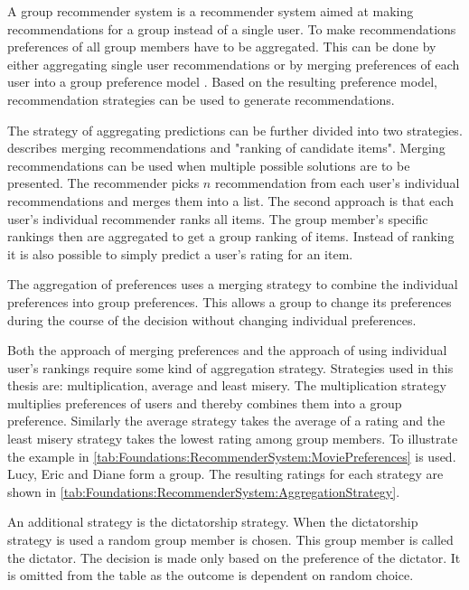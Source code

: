 A group recommender system is a recommender system aimed at making recommendations for a group instead of a single user. To make recommendations preferences of all group members have to be aggregated. This can be done by either aggregating single user recommendations or by merging preferences of each user into a group preference model \cite{jamesonRecommendationGroups2007}. Based on the resulting preference model, recommendation strategies can be used to generate recommendations.

The strategy of aggregating predictions can be further divided into two strategies. \citeauthor{felfernigAlgorithmsGroupRecommendation2018} \cite{felfernigAlgorithmsGroupRecommendation2018} describes merging recommendations and "ranking of candidate items". Merging recommendations can be used when multiple possible solutions are to be presented. The recommender picks $n$ recommendation from each user's individual recommendations and merges them into a list. The second approach is that each user's individual recommender ranks all items. The group member's specific rankings then are aggregated to get a group ranking of items. Instead of ranking it is also possible to simply predict a user's rating for an item.

The aggregation of preferences uses a merging strategy to combine the individual preferences into group preferences. This allows a group to change its preferences during the course of the decision without changing individual preferences.

Both the approach of merging preferences and the approach of using individual user's rankings require some kind of aggregation strategy. Strategies used in this thesis are: multiplication, average and least misery. The multiplication strategy multiplies preferences of users and thereby combines them into a group preference. Similarly the average strategy takes the average of a rating and the least misery strategy takes the lowest rating among group members. To illustrate the example in \autoref{tab:Foundations:RecommenderSystem:MoviePreferences} is used. Lucy, Eric and Diane form a group. The resulting ratings for each strategy are shown in \autoref{tab:Foundations:RecommenderSystem:AggregationStrategy}.

An additional strategy is the dictatorship strategy. When the dictatorship strategy is used a random group member is chosen. This group member is called the dictator. The decision is made only based on the preference of the dictator. It is omitted from the table as the outcome is dependent on random choice.


